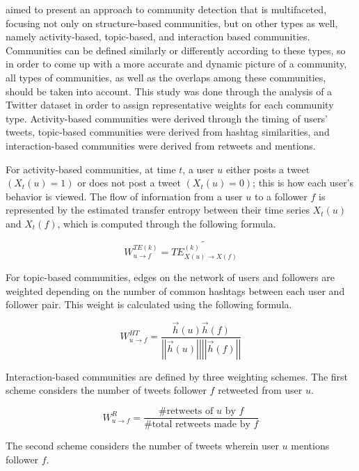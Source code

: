  aimed to present an approach to community detection that is multifaceted, focusing not only on structure-based communities, but on other types as well, namely activity-based, topic-based, and interaction based communities. Communities can be defined similarly or differently according to these types, so in order to come up with a more accurate and dynamic picture of a community, all types of communities, as well as the overlaps among these communities, should be taken into account. This study was done through the analysis of a Twitter dataset in order to assign representative weights for each community type. Activity-based communities were derived through the timing of users' tweets, topic-based communities were derived from hashtag similarities, and interaction-based communities were derived from retweets and mentions.

For activity-based communities, at time $t$, a user $u$ either posts a tweet $(X_{t}(u) = 1)$ or does not post a tweet $(X_{t}(u) = 0)$; this is how each user’s behavior is viewed. The flow of information from a user $u$ to a follower $f$ is represented by the estimated transfer entropy between their time series $X_{t}(u)$ and $X_{t}(f)$, which is computed through the following formula.

\begin{equation}
	W_{u \to f}^{TE(k)} = \tilde{TE_{X(u) \to X(f)}^{(k)}} 
\end{equation}

For topic-based communities, edges on the network of users and followers are weighted depending on the number of common hashtags between each user and follower pair. This weight is calculated using the following formula.

\begin{equation}
	W_{u \to f}^{HT} = \frac{\vec{h}(u)\vec{h}(f)}{\left|{\left|{\vec{h}(u)}\right|}\right| \left|{\left|{\vec{h}(f)}\right|}\right|}
\end{equation}

Interaction-based communities are defined by three weighting schemes. The first scheme considers the number of tweets follower $f$ retweeted from user $u$.

\begin{equation}
	W_{u \to f}^{R} = \frac{\text{\# retweets of $u$ by $f$}}{\text{\# total retweets made by $f$}}
\end{equation}

The second scheme considers the number of tweets wherein user $u$ mentions follower $f$.

